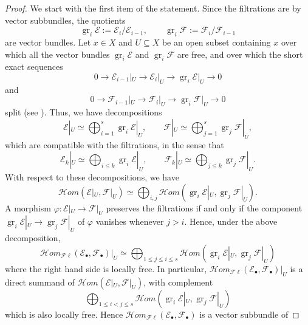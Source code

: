 \documentclass{amsart}
\theoremstyle{plain}
\numberwithin{equation}{section}
\theoremstyle{definition}
\theoremstyle{remark}
\begin{document}
	\begin{proof}
		We start with the first item of the statement. Since the filtrations are by vector subbundles, the quotients
		$$
		\operatorname{gr}_i\mathcal E:=\mathcal E_i/\mathcal E_{i-1},
		\qquad
		\operatorname{gr}_i\mathcal F:=\mathcal F_i/\mathcal F_{i-1}
		$$
		are vector bundles. Let $x\in X$ and $U\subseteq X$ be an open subset containing $x$ over which all the vector bundles
		$\operatorname{gr}_i\mathcal E$ and $\operatorname{gr}_i\mathcal F$ are free, and over which the short exact sequences
		$$
		0\longrightarrow \mathcal E_{i-1}|_U
		\longrightarrow \mathcal E_i|_U
		\longrightarrow \operatorname{gr}_i\mathcal E|_U
		\longrightarrow 0
		$$
		and
		$$
		0\longrightarrow \mathcal F_{i-1}|_U
		\longrightarrow \mathcal F_i|_U
		\longrightarrow \operatorname{gr}_i\mathcal F|_U
		\longrightarrow 0
		$$
		split (see \cite[Proposition A3.1]{EisenbudCommutativeAlgebra}). Thus, we have decompositions
		$$
		\mathcal E|_U\simeq \bigoplus_{i=1}^s \operatorname{gr}_i\mathcal E|_U,
		\qquad
		\mathcal F|_U\simeq \bigoplus_{j=1}^s \operatorname{gr}_j\mathcal F|_U,
		$$
		which are compatible with the filtrations, in the sense that
		$$
		\mathcal E_k|_U\simeq \bigoplus_{i\leq k}\operatorname{gr}_i\mathcal E|_U,
		\qquad
		\mathcal F_k|_U\simeq \bigoplus_{j\leq k}\operatorname{gr}_j\mathcal F|_U.
		$$
		With respect to these decompositions, we have
		$$
		\mathcal H om(\mathcal E|_U,\mathcal F|_U)
		\simeq
		\bigoplus_{i,j}
		\mathcal H om
		\left(
		\operatorname{gr}_i\mathcal E|_U,
		\operatorname{gr}_j\mathcal F|_U
		\right).
		$$
		A morphism $\varphi:\mathcal E|_U\to \mathcal F|_U$ preserves the filtrations if and only if the component
		$\operatorname{gr}_i\mathcal E|_U\to
		\operatorname{gr}_j\mathcal F|_U$
		of $\varphi$ vanishes whenever $j>i$. Hence, under the above decomposition,
		$$
		\mathcal H om_{\mathcal F\ell}(\mathcal E_\bullet,\mathcal F_\bullet)|_U
		\simeq
		\bigoplus_{1\leq j\leq i\leq s}
		\mathcal H om
		\left(
		\operatorname{gr}_i\mathcal E|_U,
		\operatorname{gr}_j\mathcal F|_U
		\right)
		$$
		where the right hand side is locally free.
		In particular, $\mathcal H om_{\mathcal F\ell}(\mathcal E_\bullet,\mathcal F_\bullet)|_U$ is a direct summand of
		$\mathcal H om(\mathcal E|_{U},\mathcal F|_U)$, with complement
		$$
		\bigoplus_{1\leq i<j\leq s}
		\mathcal H om
		\left(
		\operatorname{gr}_i\mathcal E|_U,
		\operatorname{gr}_j\mathcal F|_U
		\right)
		$$
		which is also locally free. 
		Hence
		$\mathcal H om_{\mathcal F\ell}(\mathcal E_\bullet,\mathcal F_\bullet)$ is a vector subbundle of

\end{proof}
\end{document}
